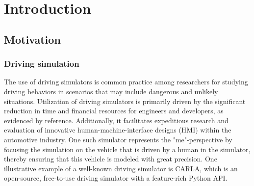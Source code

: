 \chapter{Introduction}\label{ch:introduction}

\section{Motivation}\label{sec:motivation}
    \subsection{Driving simulation}\label{subsec:driving-simulation}
        The use of driving simulators is common practice among researchers for studying driving behaviors in scenarios that may include dangerous and unlikely situations\cite{Wynne2019,That2011}.
        Utilization of driving simulators is primarily driven by the significant reduction in time and financial resources for engineers and developers, as evidenced by reference\cite{That2011}.
        Additionally, it facilitates expeditious research and evaluation of innovative human-machine-interface designs (HMI) within the automotive industry\cite{riegler2023}.
        One such simulator represents the "me"-perspective by focusing the simulation on the vehicle that is driven by a human in the simulator, thereby ensuring that this vehicle is modeled with great precision.
        One illustrative example of a well-known driving simulator is CARLA, which is an open-source, free-to-use driving simulator with a feature-rich Python API\cite{carla2017}.

